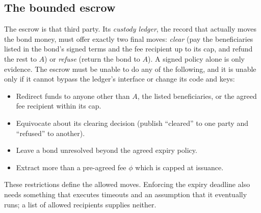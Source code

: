 \documentclass[11pt,a4paper]{article}
\theoremstyle{definition}
\theoremstyle{remark}
\begin{document}


\subsection{The bounded escrow}\label{sec:fh-escrow}

The escrow is that third party. Its \emph{custody ledger}, the record that actually moves the bond money, must offer exactly two final moves: \emph{clear} (pay the beneficiaries listed in the bond's signed terms and the fee recipient up to its cap, and refund the rest to $A$) or \emph{refuse} (return the bond to $A$). A signed policy alone is only evidence. The escrow must be unable to do any of the following, and it is unable
only if it cannot bypass the ledger's interface or change its code and keys:

\begin{itemize}[nosep]
\item Redirect funds to anyone other than $A$, the listed beneficiaries, or the agreed fee recipient within its cap.
\item Equivocate about its clearing decision (publish ``cleared'' to one party and ``refused'' to another).
\item Leave a bond unresolved beyond the agreed expiry policy.
\item Extract more than a pre-agreed fee $\phi$ which is capped at issuance.
\end{itemize}

These restrictions define the allowed moves. Enforcing the expiry deadline
also needs something that executes timeouts and an assumption that it
eventually runs; a list of allowed recipients supplies neither.
\end{document}
